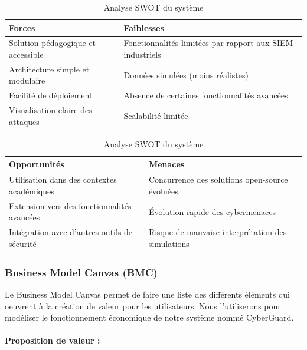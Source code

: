 \documentclass[a4paper,12pt]{report}
\begin{document}
   \begin{table}[H]
       \centering
       \begin{tabular}{|p{6cm}|p{6cm}|}
           \hline
           \textbf{Forces} & \textbf{Faiblesses} \\
           \hline
           Solution pédagogique et accessible & Fonctionnalités limitées par rapport aux SIEM industriels \\
           \hline
           Architecture simple et modulaire & Données simulées (moins réalistes) \\
           \hline
           Facilité de déploiement & Absence de certaines fonctionnalités avancées \\
           \hline
           Visualisation claire des attaques & Scalabilité limitée \\
           \hline
       \end{tabular}
       
       \vspace{0.5cm}
       
       \begin{tabular}{|p{6cm}|p{6cm}|}
           \hline
           \textbf{Opportunités} & \textbf{Menaces} \\
           \hline
           Utilisation dans des contextes académiques & Concurrence des solutions open-source évoluées \\
           \hline
           Extension vers des fonctionnalités avancées & Évolution rapide des cybermenaces \\
           \hline
           Intégration avec d’autres outils de sécurité & Risque de mauvaise interprétation des simulations \\
           \hline
       \end{tabular}
       
       \caption{Analyse SWOT du système}
   \end{table}
   
   \subsubsection{Business Model Canvas (BMC)}
   
   Le Business Model Canvas permet de faire une liste des différents éléments qui oeuvrent à la création de valeur pour les utilisateurs. Nous l'utiliserons pour modéliser le fonctionnement économique de notre système nommé CyberGuard.
   
   \paragraph{Proposition de valeur :}
   
\end{document}
